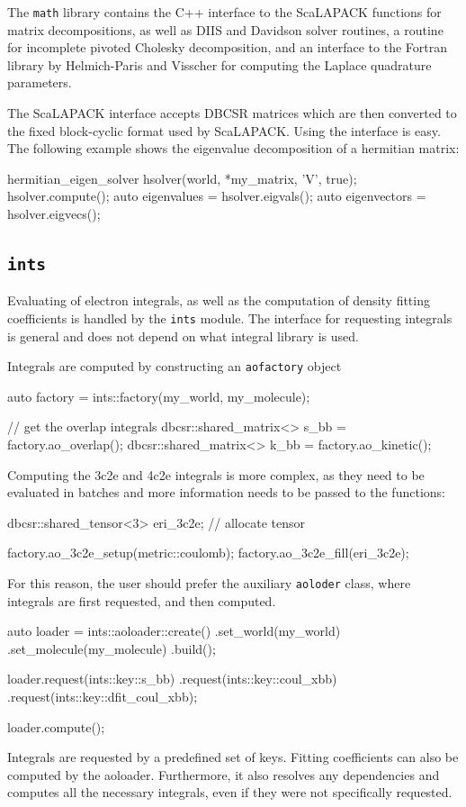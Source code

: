 The \texttt{math} library contains the C++ interface to the ScaLAPACK functions for matrix decompositions, as well as DIIS and Davidson solver routines, a routine for incomplete pivoted Cholesky decomposition, and an interface to the Fortran library by Helmich-Paris and Visscher \cite{Hel2016} for computing the Laplace quadrature parameters. 

The ScaLAPACK interface accepts DBCSR matrices which are then converted to the fixed block-cyclic format used by ScaLAPACK. Using the interface is easy. The following example shows the eigenvalue decomposition of a hermitian matrix:
\begin{cppinline}
hermitian_eigen_solver hsolver(world, *my_matrix, 'V', true);
hsolver.compute();
auto eigenvalues = hsolver.eigvals();
auto eigenvectors = hsolver.eigvecs();
\end{cppinline} 

\subsection{\texttt{ints}}

Evaluating of electron integrals, as well as the computation of density fitting coefficients is handled by the \texttt{ints} module. The interface for requesting integrals is general and does not depend on what integral library is used. 

Integrals are computed by constructing an \texttt{aofactory} object
\begin{cppinline}
auto factory = ints::factory(my_world, my_molecule);

// get the overlap integrals
dbcsr::shared_matrix<> s_bb = factory.ao_overlap();
dbcsr::shared_matrix<> k_bb = factory.ao_kinetic();
\end{cppinline}
\noindent Computing the 3c2e and 4c2e integrals is more complex, as they need to be evaluated in batches and more information needs to be passed to the functions:
\begin{cppinline}
dbcsr::shared_tensor<3> eri_3c2e;
// allocate tensor

factory.ao_3c2e_setup(metric::coulomb);
factory.ao_3c2e_fill(eri_3c2e);
\end{cppinline}
\noindent For this reason, the user should prefer the auxiliary  \texttt{aoloder} class, where integrals are first requested, and then computed.
\begin{cppinline}
auto loader = ints::aoloader::create()
	.set_world(my_world)
	.set_molecule(my_molecule)
	.build();
	
loader.request(ints::key::s_bb)
	.request(ints::key::coul_xbb)
	.request(ints::key::dfit_coul_xbb);
	
loader.compute();
\end{cppinline}
\noindent Integrals are requested by a predefined set of keys. Fitting coefficients can also be computed by the aoloader. Furthermore, it also resolves any dependencies and computes all the necessary integrals, even if they were not specifically requested. 

